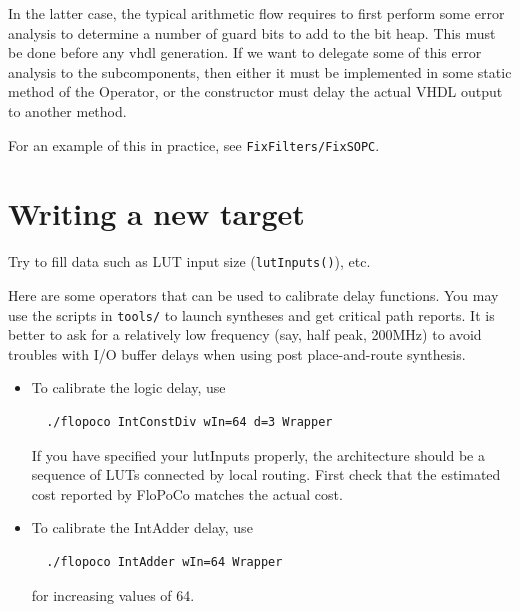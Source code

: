 \documentclass{article}
\begin{document}
In the latter case, the typical arithmetic flow requires to first perform some error analysis to determine a number of guard bits to add to the bit heap.
This must be done before any vhdl generation.
If we want to delegate some of this error analysis to the subcomponents, then either it must be implemented in some static method of the Operator, or the constructor must delay the actual VHDL output to another method.

For an example of this in practice, see \texttt{FixFilters/FixSOPC}.


\section{Writing a new target}
Try to fill data such as LUT input size (\texttt{lutInputs()}), etc.

Here are some operators that can be used to calibrate delay functions.
You may use the scripts in \texttt{tools/} to launch syntheses and get critical path reports.
It is better to ask for a relatively low frequency (say, half peak, 200MHz) to avoid troubles with I/O buffer delays when using post place-and-route synthesis.

\begin{itemize}
\item To calibrate the logic delay, use 
\begin{verbatim}
  ./flopoco IntConstDiv wIn=64 d=3 Wrapper
\end{verbatim}
  If you have specified your lutInputs properly, the architecture should be a sequence of LUTs connected by local routing.
  First check that the estimated cost reported by FloPoCo matches the actual cost. 
  
\item To calibrate the IntAdder delay, use
\begin{verbatim}
  ./flopoco IntAdder wIn=64 Wrapper
\end{verbatim}
  for increasing values of 64.
  
\end{itemize}




\end{document}
